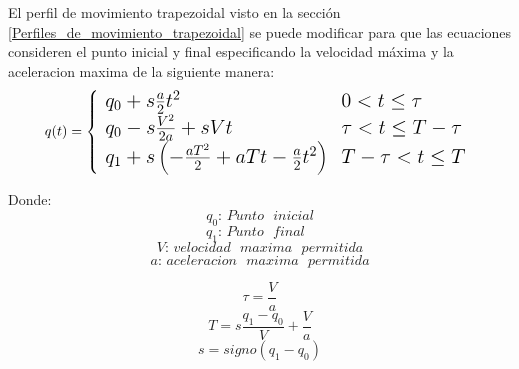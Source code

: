     El perfil de movimiento trapezoidal visto en la sección \ref{Perfiles_de_movimiento_trapezoidal} se puede modificar para que las ecuaciones consideren el punto inicial y final especificando la velocidad máxima y la aceleracion maxima de la siguiente manera:
        \begin{equation}
        \Large
            q(t) = \left\lbrace
                \begin{array}{ll}
                q_0 + s\frac{a}{2}t^2&   0< t \leq \tau\\
                q_0 - s\frac{V^2}{2a}+sVt &  \tau< t \leq T- \tau\\
                q_1 + s \left( -\frac{aT^2}{2}+aTt-\frac{a}{2}t^2 \right) &  T- \tau< t \leq T\\
            \end{array}
            \right.
            \label{eq:cap6_tray_1}
        \end{equation}
    
    Donde:
    \begin{equation*}
       \text{$q_0$: $Punto$ $inicial$}
    \end{equation*}
    \begin{equation*}
       \text{$q_1$: $Punto$ $final$ }
    \end{equation*}
    \begin{equation*}
       \text{$V$: $velocidad$ $maxima$ $permitida$}
    \end{equation*}
    \begin{equation*}
       \text{$a$: $aceleracion$ $maxima$ $permitida$}
    \end{equation*}
    
    \newpage
    
    \begin{equation}
        \tau=\frac{V}{a}
    \label{eq:cap6_tray_4}
    \end{equation}
    \begin{equation}
        T=s\frac{q_1-q_0}{V}+\frac{V}{a}
    \label{eq:cap6_tray_5}
    \end{equation}
    \begin{equation}
        s=signo(q_1-q_0)
    \label{eq:cap6_tray_6}
    \end{equation}
    

